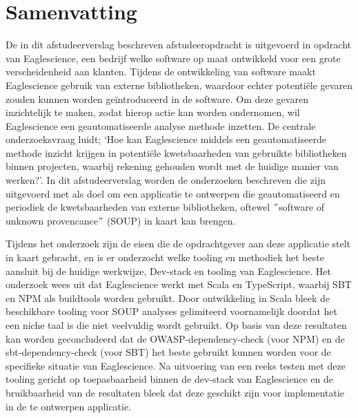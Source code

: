 


\chapter{Samenvatting}\label{ch:samenvatting}

De in dit afstudeerverslag beschreven afstudeeropdracht is uitgevoerd in opdracht van Eaglescience, een bedrijf welke software op maat ontwikkeld voor een grote verscheidenheid aan klanten. Tijdens de ontwikkeling van software maakt Eaglescience gebruik van externe bibliotheken, waardoor echter potentiële gevaren zouden kunnen worden geïntroduceerd in de software. Om deze gevaren inzichtelijk te maken, zodat hierop actie kan worden ondernomen, wil Eaglescience een geautomatiseerde analyse methode inzetten. De centrale onderzoeksvraag luidt; ‘Hoe kan Eaglescience middels een geautomatiseerde methode inzicht krijgen in potentiële kwetsbaarheden van gebruikte bibliotheken binnen projecten, waarbij rekening gehouden wordt met de huidige manier van werken?’. In dit afstudeerverslag worden de onderzoeken beschreven die zijn uitgevoerd met als doel om een applicatie te ontwerpen die geautomatiseerd en periodiek de kwetsbaarheden van externe bibliotheken, oftewel $"$software of unknown provencance$"$ (SOUP) in kaart kan brengen.

Tijdens het onderzoek zijn de eisen die de opdrachtgever aan deze applicatie stelt in kaart gebracht, en is er onderzocht welke tooling en methodiek het beste aansluit bij de huidige werkwijze, Dev-stack en tooling van Eaglescience. Het onderzoek wees uit dat Eaglescience werkt met Scala en TypeScript, waarbij SBT en NPM als buildtools worden gebruikt. Door ontwikkeling in Scala bleek de beschikbare tooling voor SOUP analyses gelimiteerd voornamelijk doordat het een niche taal is die niet veelvuldig wordt gebruikt. Op basis van deze resultaten kan worden geconcludeerd dat de OWASP-dependency-check (voor NPM) en de sbt-dependency-check (voor SBT) het beste gebruikt kunnen worden voor de specifieke situatie van Eaglescience.
Na uitvoering van een reeks testen met deze tooling gericht op toepasbaarheid binnen de dev-stack van Eaglescience en de bruikbaarheid van de resultaten bleek dat deze geschikt zijn voor implementatie in de te ontwerpen applicatie.

